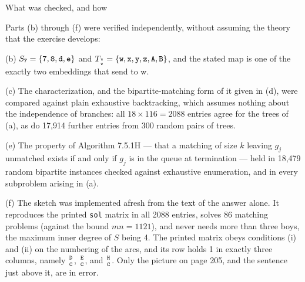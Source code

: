 \beginsection What was checked, and how

Parts (b) through (f) were verified independently, without assuming the theory
that the exercise develops:
\medskip
\item{(b)} $S_{\tt 7}=\{{\tt 7},{\tt 8},{\tt d},{\tt e}\}$ and
  $T_{{{\tt u}\atop{\tt w}}}=\{{\tt w},{\tt x},{\tt y},{\tt z},{\tt A},{\tt B}\}$, and the stated map is one of
  the exactly two embeddings that send  to \n w.
\item{(c)} The characterization, and the bipartite-matching form of it
  given in (d), were compared against plain exhaustive backtracking, which assumes nothing about
  the independence of branches: all $18\times116=2088$ entries agree for the
  trees of (a), as do 17,914 further entries from 300 random pairs of trees.
\item{(e)} The property of Algorithm 7.5.1H --- that a matching of size $k$
  leaving $g_j$ unmatched exists if and only if $g_j$ is in the queue at
  termination --- held in 18,479 random bipartite instances checked against
  exhaustive enumeration, and in every subproblem arising in (a).
\item{(f)} The sketch was implemented afresh from the text of the answer alone.
  It reproduces the printed {\tt sol} matrix in all 2088 entries, solves 86
  matching problems (against the bound $mn=1121$), and never needs more than
  three boys, the maximum inner degree of $S$ being 4. The printed matrix obeys
  conditions (i) and (ii) on the numbering of the arcs, and its row  holds 1
  in exactly three columns, namely ${{\tt D}\atop{\tt C}}$, ${{\tt E}\atop{\tt C}}$, and ${{\tt H}\atop{\tt C}}$.
\medskip
\noindent
Only the picture on page 205, and the sentence just above it, are in error.

\bye
